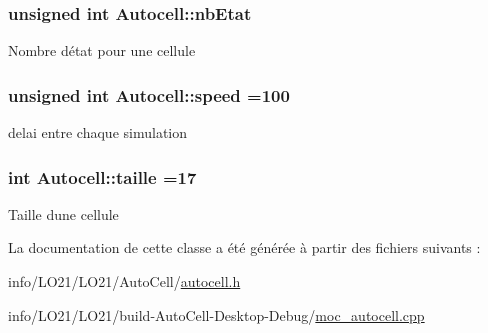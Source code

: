\subsubsection[{\texorpdfstring{nb\+Etat}{nbEtat}}]{\setlength{\rightskip}{0pt plus 5cm}unsigned int Autocell\+::nb\+Etat\hspace{0.3cm}{\ttfamily [protected]}}\hypertarget{class_autocell_a35a3592704f2fe987c846017b0fc83b2}{}\label{class_autocell_a35a3592704f2fe987c846017b0fc83b2}
Nombre d\textquotesingle{}état pour une cellule 
\subsubsection[{\texorpdfstring{speed}{speed}}]{\setlength{\rightskip}{0pt plus 5cm}unsigned int Autocell\+::speed =100\hspace{0.3cm}{\ttfamily [protected]}}\hypertarget{class_autocell_a52291657adce98a0443559a5cd2e0c0b}{}\label{class_autocell_a52291657adce98a0443559a5cd2e0c0b}
delai entre chaque simulation 
\subsubsection[{\texorpdfstring{taille}{taille}}]{\setlength{\rightskip}{0pt plus 5cm}int Autocell\+::taille =17\hspace{0.3cm}{\ttfamily [protected]}}\hypertarget{class_autocell_abcfd3af5e49b6a5b4538fb22a5f06d81}{}\label{class_autocell_abcfd3af5e49b6a5b4538fb22a5f06d81}
Taille d\textquotesingle{}une cellule 

La documentation de cette classe a été générée à partir des fichiers suivants \+:\begin{DoxyCompactItemize}
\item 
info/\+L\+O21/\+L\+O21/\+Auto\+Cell/\hyperlink{autocell_8h}{autocell.\+h}\item 
info/\+L\+O21/\+L\+O21/build-\/\+Auto\+Cell-\/\+Desktop-\/\+Debug/\hyperlink{moc__autocell_8cpp}{moc\+\_\+autocell.\+cpp}\end{DoxyCompactItemize}

